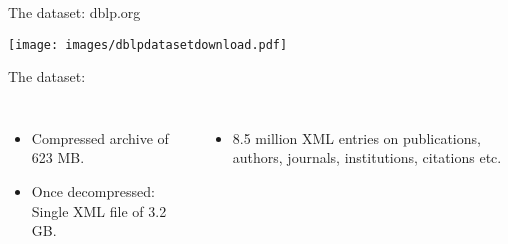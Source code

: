 \documentclass[aspectratio = 169, 15pt]{beamer}
\begin{document}
    \begin{frame}{The dataset: dblp.org}
        \begin{center}
            \vspace*{-0.1cm}
            \texttt{[image: images/dblpdatasetdownload.pdf]}
        \end{center}
        
        \vspace*{-0.3cm}
        {\color{darkgray}The dataset:}
        \begin{columns}[t]
                \vspace*{-0.6cm}
                \begin{itemize}
                	\item Compressed archive of 623 MB.
                	\item Once decompressed: Single XML file of 3.2 GB.
                \end{itemize}
                
                \vspace*{-0.6cm}
                \begin{itemize}
                	\item 8.5 million XML entries on publications, authors, journals, institutions, citations etc.
                \end{itemize}
        \end{columns}
    \end{frame}
    
\end{document}
